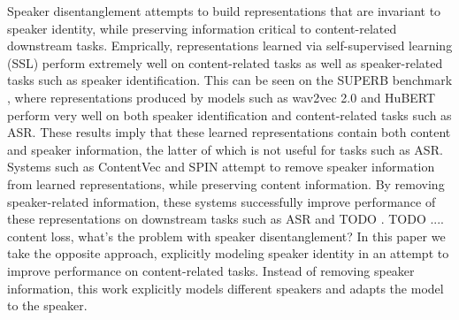 Speaker disentanglement attempts to build representations that are invariant to speaker identity, while preserving information critical to content-related downstream tasks.
Emprically, representations learned via self-supervised learning (SSL) perform extremely well on content-related tasks as well as speaker-related tasks such as speaker identification.
This can be seen on the SUPERB benchmark \cite{}, where representations produced by models such as wav2vec 2.0 and HuBERT \cite{wav2vec2, hubert} perform very well on both speaker identification and content-related tasks such as ASR.
These results imply that these learned representations contain both content and speaker information, the latter of which is not useful for tasks such as ASR.
Systems such as ContentVec \cite{contentvec} and SPIN \cite{spin} attempt to remove speaker information from learned representations, while preserving content information.
By removing speaker-related information, these systems successfully improve performance of these representations on downstream tasks such as ASR and TODO \cite{contentvec, spin}.
TODO .... content loss, what's the problem with speaker disentanglement?
In this paper we take the opposite approach, explicitly modeling speaker identity in an attempt to improve performance on content-related tasks.
Instead of removing speaker information, this work explicitly models different speakers and adapts the model to the speaker.
